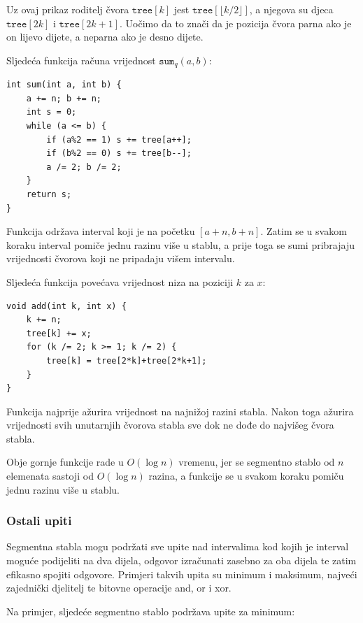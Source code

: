 Uz ovaj prikaz
roditelj čvora $\texttt{tree}[k]$
jest $\texttt{tree}[\lfloor k/2 \rfloor]$,
a njegova su djeca $\texttt{tree}[2k]$
i $\texttt{tree}[2k+1]$.
Uočimo da to znači da je pozicija čvora
parna ako je on lijevo dijete, a neparna ako je desno dijete.

Sljedeća funkcija
računa vrijednost $\texttt{sum}_q(a,b)$:
\begin{lstlisting}
int sum(int a, int b) {
    a += n; b += n;
    int s = 0;
    while (a <= b) {
        if (a%2 == 1) s += tree[a++];
        if (b%2 == 0) s += tree[b--];
        a /= 2; b /= 2;
    }
    return s;
}
\end{lstlisting}
Funkcija održava interval
koji je na početku $[a+n,b+n]$.
Zatim se u svakom koraku interval pomiče
jednu razinu više u stablu,
a prije toga se sumi pribrajaju vrijednosti čvorova
koji ne pripadaju višem intervalu.

Sljedeća funkcija povećava vrijednost niza
na poziciji $k$ za $x$:
\begin{lstlisting}
void add(int k, int x) {
    k += n;
    tree[k] += x;
    for (k /= 2; k >= 1; k /= 2) {
        tree[k] = tree[2*k]+tree[2*k+1];
    }
}
\end{lstlisting}
Funkcija najprije ažurira vrijednost
na najnižoj razini stabla.
Nakon toga ažurira vrijednosti svih
unutarnjih čvorova stabla sve dok ne dođe
do najvišeg čvora stabla.

Obje gornje funkcije rade
u $O(\log n)$ vremenu, jer se segmentno stablo
od $n$ elemenata sastoji od $O(\log n)$ razina,
a funkcije se u svakom koraku pomiču jednu razinu
više u stablu.

\subsubsection{Ostali upiti}

Segmentna stabla mogu podržati sve upite nad intervalima
kod kojih je interval moguće podijeliti na dva dijela,
odgovor izračunati zasebno za oba dijela
te zatim efikasno spojiti odgovore.
Primjeri takvih upita su
minimum i maksimum, najveći zajednički djelitelj
te bitovne operacije and, or i xor.

Na primjer, sljedeće segmentno stablo
podržava upite za minimum:


